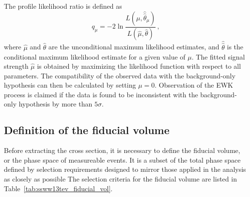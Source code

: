 The profile likelihood ratio is defined as
\begin{equation}
  q_{\mu} = -2\ln\frac{L(\mu,\hat{\hat{\theta}}_{\mu})}{L(\hat{\mu},\hat{\theta})}\,,
  \label{dq:ssww13tev_xsec_test_statistic}
\end{equation}
where $\hat{\mu}$ and $\hat{\theta}$ are the unconditional maximum likelihood estimates, and $\hat{\hat{\theta}}$ is the conditional maximum likelihood estimate for a given value of $\mu$.
The fitted signal strength $\hat{\mu}$ is obtained by maximizing the likelihood function with respect to all parameters.
The compatibility of the observed data with the background-only hypothesis can then be calculated by setting $\mu=0$.
Observation of the \ssww EWK process is claimed if the data is found to be inconsistent with the background-only hypothesis by more than $5\sigma$.


\subsection{Definition of the fiducial volume}\label{ssww13tev:xsec_fid_vol}
Before extracting the cross section, it is necessary to define the fiducial volume, or the phase space of measureable events.
It is a subset of the total phase space defined by selection requirements designed to mirror those applied in the analysis as closely as possible
The selection criteria for the fiducial volume are listed in Table~\ref{tab:ssww13tev_fiducial_vol}.

